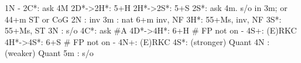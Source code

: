 1N -
2C*: ask 4M
2D*->2H*: 5+H
2H*->2S*: 5+S
2S*: ask 4m. s/o in 3m; or 44+m ST or CoG
2N : inv
3m : nat 6+m inv, NF 
3H*: 55+Ms, inv, NF 
3S*: 55+Ms, ST
3N : s/o
4C*: ask #A
4D*->4H*: 6+H  # FP not on
        - 4S+: (E)RKC 
4H*->4S*: 6+S  # FP not on
        - 4N+: (E)RKC
4S*: (stronger) Quant
4N : (weaker) Quant
5m : s/o
